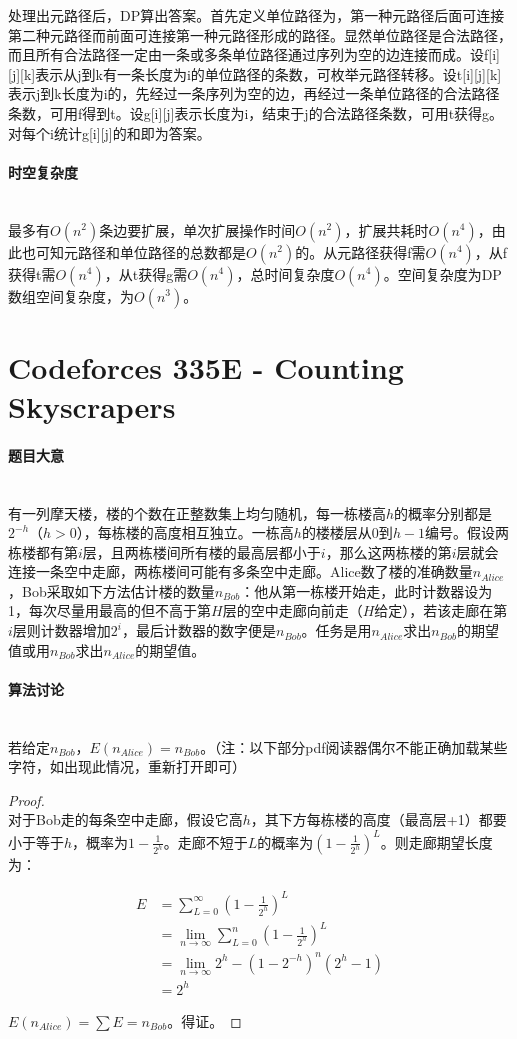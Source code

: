 \documentclass[UTF8]{ctexart}
\newcommand{\myparagraph}[1]{\paragraph{#1}\mbox{}\\}
\theoremstyle{nonumberplain}
\newtheorem{proof}{\hspace{1em}证明：}
\begin{document}
			处理出元路径后，DP算出答案。首先定义单位路径为，第一种元路径后面可连接第二种元路径而前面可连接第一种元路径形成的路径。显然单位路径是合法路径，而且所有合法路径一定由一条或多条单位路径通过序列为空的边连接而成。设f[i][j][k]表示从j到k有一条长度为i的单位路径的条数，可枚举元路径转移。设t[i][j][k]表示j到k长度为i的，先经过一条序列为空的边，再经过一条单位路径的合法路径条数，可用f得到t。设g[i][j]表示长度为i，结束于j的合法路径条数，可用t获得g。对每个i统计g[i][j]的和即为答案。
		
		\myparagraph{时空复杂度}
		
			最多有$O(n^2)$条边要扩展，单次扩展操作时间$O(n^2)$，扩展共耗时$O(n^4)$，由此也可知元路径和单位路径的总数都是$O(n^2)$的。从元路径获得f需$O(n^4)$，从f获得t需$O(n^4)$，从t获得g需$O(n^4)$，总时间复杂度$O(n^4)$。空间复杂度为DP数组空间复杂度，为$O(n^3)$。
	
	\section{Codeforces 335E - Counting Skyscrapers}
	
		\myparagraph{题目大意}
		
			有一列摩天楼，楼的个数在正整数集上均匀随机，每一栋楼高$h$的概率分别都是$2^{-h}$（$h>0$），每栋楼的高度相互独立。一栋高$h$的楼楼层从0到$h-1$编号。假设两栋楼都有第$i$层，且两栋楼间所有楼的最高层都小于$i$，那么这两栋楼的第$i$层就会连接一条空中走廊，两栋楼间可能有多条空中走廊。Alice数了楼的准确数量$n_{Alice}$，Bob采取如下方法估计楼的数量$n_{Bob}$：他从第一栋楼开始走，此时计数器设为1，每次尽量用最高的但不高于第$H$层的空中走廊向前走（$H$给定），若该走廊在第$i$层则计数器增加$2^i$，最后计数器的数字便是$n_{Bob}$。任务是用$n_{Alice}$求出$n_{Bob}$的期望值或用$n_{Bob}$求出$n_{Alice}$的期望值。
		
		\myparagraph{算法讨论}
			
			若给定$n_{Bob}$，$E(n_{Alice})=n_{Bob}$。（注：以下部分pdf阅读器偶尔不能正确加载某些字符，如出现此情况，重新打开即可）
			
			\begin{proof}\mbox{}\\
			
				对于Bob走的每条空中走廊，假设它高$h$，其下方每栋楼的高度（最高层+1）都要小于等于$h$，概率为$1-\frac{1}{2^h}$。走廊不短于$L$的概率为$(1-\frac{1}{2^h})^L$。则走廊期望长度为：
				
				$$\begin{aligned}
					E&=\sum_{L=0}^\infty(1-\frac{1}{2^h})^L\\
					 &=\lim_{n \to \infty} \sum_{L=0}^n(1-\frac{1}{2^h})^L\\
					 &=\lim_{n \to \infty} 2^h-(1-2^{-h})^n(2^h-1)\\
					 &=2^h
				\end{aligned}$$
				
				$E(n_{Alice})=\sum E=n_{Bob}$。得证。
			
			\end{proof}
			
\end{document}
